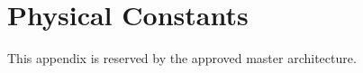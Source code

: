 \chapter{Physical Constants}
\label{app:physical_constants}

This appendix is reserved by the approved master architecture.
